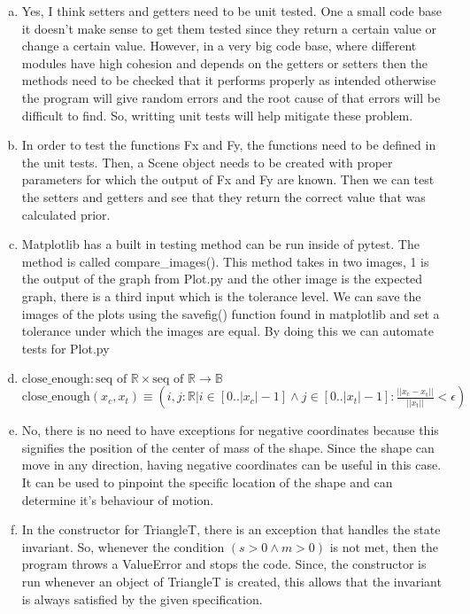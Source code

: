 \documentclass[12pt]{article}
\begin{document}
\begin{enumerate}[a)]

	\item Yes, I think setters and getters need to be unit tested. One a small code base it doesn't make sense to get them tested since they return a certain value or change a certain value. However, in a very big code base, where different modules have high cohesion and depends on the getters or setters then the methods need to be checked that it performs properly as intended otherwise the program will give random errors and the root cause of that errors will be difficult to find. So, writting unit tests will help mitigate these problem.

	\item In order to test the functions Fx and Fy, the functions need to be defined in the unit tests. Then, a Scene object needs to be created with proper parameters for which the output of Fx and Fy are known. Then we can test the setters and getters and see that they return the correct value that was calculated prior.

	\item Matplotlib has a built in testing method can be run inside of pytest. The method is called compare\_images(). This method takes in two images, 1 is the output of the graph from Plot.py and the other image is the expected graph, there is a third input which is the tolerance level. We can save the images of the plots using the savefig() function found in matplotlib and set a tolerance under which the images are equal. By doing this we can automate tests for Plot.py

	\item \noindent $\text{close\_enough}: \text{seq of } \mathbb{R} \times \text{seq of } \mathbb{R} \rightarrow \mathbb{B}$\\
\noindent $\text{close\_enough}(x_c, x_t) \equiv (i, j: \mathbb{R} | i \in [0 .. |x_c|-1] \land j \in [0 .. |x_t|-1] : \frac{|| x_\text{c} - x_\text{t} ||} {||x_\text{t}||} < \epsilon)$



	\item No, there is no need to have exceptions for negative coordinates because this signifies the position of the center of mass of the shape. Since the shape can move in any direction, having negative coordinates can be useful in this case. It can be used to pinpoint the specific location of the shape and can determine it's behaviour of motion.

	\item In the constructor for TriangleT, there is an exception that handles the state invariant. So, whenever the condition $(s > 0 \land m > 0)$ is not met, then the program throws a ValueError and stops the code. Since, the constructor is run whenever an object of TriangleT is created, this allows that the invariant is always satisfied by the given specification.


\end{enumerate}
\end{document}
